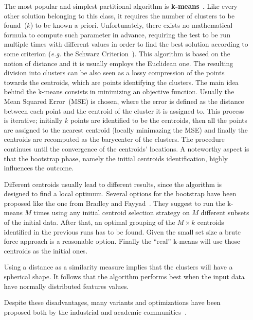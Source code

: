 The most popular and simplest partitional algorithm is \textbf{k-means}~\cite{macqueen1967some}.
Like every other solution belonging to this class, it requires the number of clusters to be found~($k$) to be known a-priori.
Unfortunately, there exists no mathematical formula to compute such parameter in advance,
requiring the test to be run multiple times with different values in order to find the best solution according to some criterion (\emph{e.g.} the Schwarz Criterion~\cite{schwarz1978estimating}).
This algorithm is based on the notion of distance and it is usually employs the Euclidean one.
The resulting division into clusters can be also seen as a lossy compression of the points towards the centroids, which are points identifying the clusters.
The main idea behind the k-means consists in minimizing an objective function.
Usually the Mean Squared Error~(MSE) is chosen, where the error is defined as the distance between each point and the centroid of the cluster it is assigned to.
This process is iterative; initially $k$ points are identified to be the centroids,
then all the points are assigned to the nearest centroid (locally minimazing the MSE)
and finally the centroids are recomputed as the barycenter of the clusters.
The procedure continues until the convergence of the centroids' locations.
A noteworthy aspect is that the bootstrap phase, namely the initial centroids identification, highly influences the outcome.

Different centroids usually lead to different results, since the algorithm is designed to find a local optimum.
Several options for the bootstrap have been proposed like the one from Bradley and Fayyad~\cite{bradley1998refining}.
They suggest to run the k-means $M$ times using any initial centroid selection strategy
on $M$ different subsets of the initial data.
After that, an optimal grouping of the $M \times k$ centroids identified in the previous runs has to be found.
Given the small set size a brute force approach is a reasonable option.
Finally the ``real'' k-means will use those centroids as the initial ones.

Using a distance as a similarity measure implies that the clusters will have a spherical shape.
It follows that the algorithm performs best when the input data have normally distributed features values.

Despite these disadvantages, many variants and optimizations have been proposed both by the industrial and academic communities~\cite{kanungo2002efficient,likas2003global,elkan2003using}.


